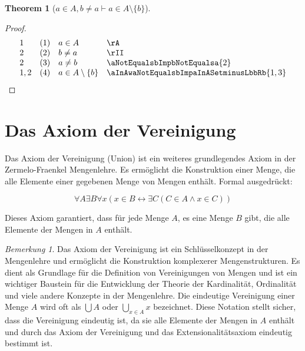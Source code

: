\documentclass{book}
\theoremstyle{plain}
\newtheorem{theorem}{Theorem}
\theoremstyle{remark}
\newtheorem*{remark}{Bemerkung}
\theoremstyle{definition}
\begin{document}
\label{aInAwbNotEqualsaImpaInASetminusLbbRb}
\begin{theorem}[\(a\in A, b\neq a\vdash a\in A\setminus\{b\}\)]
\end{theorem}
\begin{proof}
    \[
	\begin{array}{llll}
		1 & (1) & a\in A & \rA \\
		2 & (2) & b\neq a & \rII \\
            2 & (3) & a\neq b & \aNotEqualsbImpbNotEqualsa{2} \\
		1,2 & (4) & a\in A\setminus \{b\} & \aInAwaNotEqualsbImpaInASetminusLbbRb{1,3} \\
	\end{array}
    \]
\end{proof}



\section{Das Axiom der Vereinigung}

Das Axiom der Vereinigung (Union) ist ein weiteres grundlegendes Axiom in der Zermelo-Fraenkel Mengenlehre. Es ermöglicht die Konstruktion einer Menge, die alle Elemente einer gegebenen Menge von Mengen enthält. Formal ausgedrückt:

\label{FaAExBFaxLpxInBLrExCLpCInAAndxInCRpRp}
\[
\forall A \exists B \forall x (x \in B \leftrightarrow \exists C (C \in A \land x \in C))
\]

Dieses Axiom garantiert, dass für jede Menge \( A \), es eine Menge \( B \) gibt, die alle Elemente der Mengen in \( A \) enthält.

\begin{remark}
	Das Axiom der Vereinigung ist ein Schlüsselkonzept in der Mengenlehre und ermöglicht die Konstruktion komplexerer Mengenstrukturen. Es dient als Grundlage für die Definition von Vereinigungen von Mengen und ist ein wichtiger Baustein für die Entwicklung der Theorie der Kardinalität, Ordinalität und viele andere Konzepte in der Mengenlehre. Die eindeutige Vereinigung einer Menge \( A \) wird oft als \( \bigcup A \) oder \( \bigcup_{x \in A} x \) bezeichnet. Diese Notation stellt sicher, dass die Vereinigung eindeutig ist, da sie alle Elemente der Mengen in \( A \) enthält und durch das Axiom der Vereinigung und das Extensionalitätsaxiom eindeutig bestimmt ist.
\end{remark}
\end{document}
